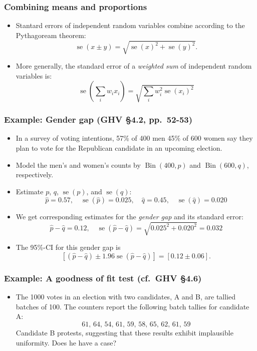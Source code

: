 \documentclass{beamer}
\DeclareMathOperator{\stderr}{se}
\DeclareMathOperator{\Bin}{Bin}
\begin{document}
\begin{frame}
    \frametitle{Combining means and proportions}

    \begin{itemize}
        \item Stantard errors of independent random variables combine according to the Pythagoream theorem:
        \[
        \stderr(x\pm y) = \sqrt{\stderr(x)^2 + \stderr(y)^2}.
        \]

        \item More generally, the standard error of a \emph{weighted sum} of independent random variables is:
        \[
        \stderr\left(\sum_iw_ix_i\right) = 
        \sqrt{\sum_iw_i^2\stderr(x_i)^2}
        \]
    \end{itemize}
\end{frame}

\begin{frame}
    \frametitle{Example: Gender gap (GHV \S4.2, pp.~52-53)}

    \begin{itemize}
        \item In a survey of voting intentions, 57\% of 400 men 45\% of 600 women
        say they plan to vote for the Republican candidate in an upcoming election. 

        \item Model the men's and women's counts by $\Bin(400, p)$ and $\Bin(600, q)$, respectively.
        
        \item Estimate $p$, $q$, $\stderr(p)$, and $\stderr(q)$:
        \[
            \hat{p}=0.57,\quad \stderr(\hat{p})=0.025,\quad \hat{q} = 0.45,
            \quad\stderr(\hat{q})= 0.020
        \]

        \item We get corresponding estimates for the \emph{gender gap} and its standard error:
        \[
        \hat{p} - \hat{q} = 0.12,\quad \stderr(\hat{p} - \hat{q}) = \sqrt{0.025^2 + 0.020^2} = 0.032
        \]

        \item The 95\%-CI for this gender gap is
        \[
        \left[(\hat{p} - \hat{q}) \pm 1.96\stderr(\hat{p} - \hat{q})\right] = 
        \left[0.12 \pm 0.06\right].
        \]
    \end{itemize}
\end{frame}

    \begin{frame}
        \frametitle{Example: A goodness of fit test (cf.~GHV \S4.6)}
        
        \begin{itemize}
            \item The 1000 votes in an election with two candidates, A and B, are tallied batches of 100. The counters report the following batch tallies for candidate A:
            \[
            61,\, 64,\, 54,\, 61,\, 59,\, 58,\, 65,\, 62,\, 61,\, 59
            \]
            Candidate B protests, suggesting that these results exhibit implausible uniformity. Does he have a case?
        \end{itemize}

    \end{frame}
\end{document}
